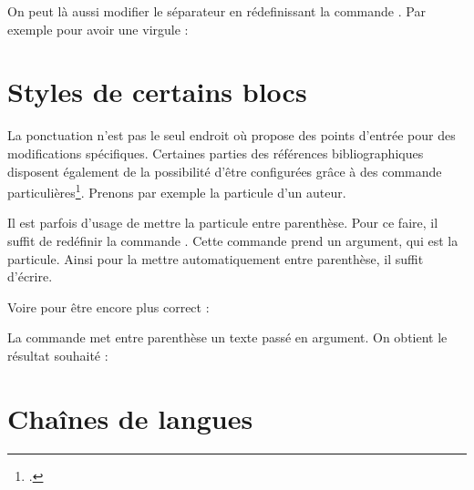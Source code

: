 On peut là aussi modifier le séparateur en rédefinissant la commande . Par exemple pour avoir une virgule :

\begin{latexcode}
\renewcommand{\multicitedelim}[0]{\addcomma\addspace}
\end{latexcode}


\section{Styles de certains blocs}

La ponctuation n'est pas le seul endroit où  propose des points d'entrée pour des modifications spécifiques. Certaines parties des références bibliographiques disposent également de la possibilité d'être configurées grâce à des commande particulières\footcite{biblatex_hooks}. Prenons par exemple la particule d'un auteur.
    
    \bibverbose
    \begin{quotation}
    \cite{BeauvoirSexe}
    \end{quotation}
    
    \renewcommand{\mkbibnameprefix}[1]{\parentext{#1}}


    
Il est parfois d'usage de mettre la particule entre parenthèse. Pour ce faire, il suffit de redéfinir la commande . Cette commande prend un argument, qui est la particule. Ainsi pour la mettre automatiquement entre parenthèse, il suffit d'écrire.
    
    \begin{latexcode}
\renewcommand{\mkbibnameprefix}[1]{(#1)}
    \end{latexcode}

    
Voire pour être encore plus correct :
    
    \begin{latexcode}
\renewcommand{\mkbibnameprefix}[1]{\parentext{#1}}
    \end{latexcode}


La commande  met entre parenthèse un texte passé en argument. On obtient le résultat souhaité : 

    \begin{quotation}
    \cite{BeauvoirSexe}
    \end{quotation}
    
\bibverbose

\section{Chaînes de langues}\label{i18nchaines}
    

